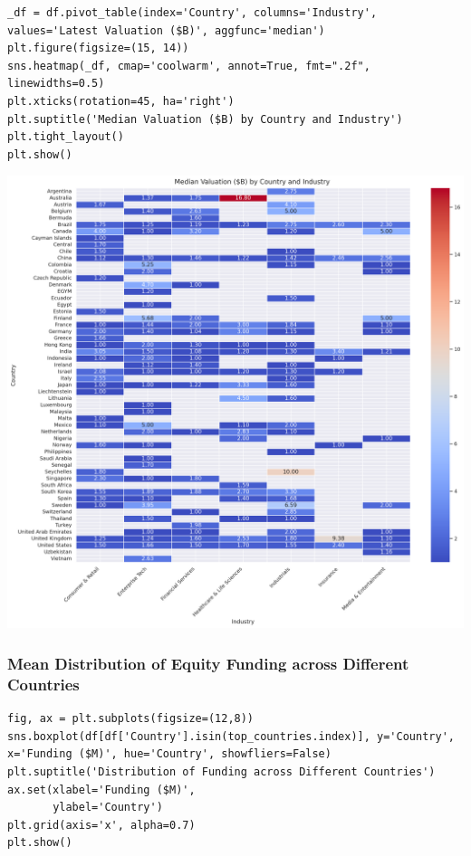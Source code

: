 \documentclass[a4paper,12pt]{article}
\begin{document}
\begin{verbatim}
_df = df.pivot_table(index='Country', columns='Industry', values='Latest Valuation ($B)', aggfunc='median')
plt.figure(figsize=(15, 14))
sns.heatmap(_df, cmap='coolwarm', annot=True, fmt=".2f", linewidths=0.5)
plt.xticks(rotation=45, ha='right')
plt.suptitle('Median Valuation ($B) by Country and Industry')
plt.tight_layout()
plt.show()
\end{verbatim}

\begin{center}
\includegraphics[width=.9\linewidth]{./.ob-jupyter/8191e29d90b7253a853630fc7935bf3868045f13.png}
\label{}
\end{center}
\subsubsection{Mean Distribution of Equity Funding across Different Countries}
\label{sec:org0e7e60d}
\begin{verbatim}
fig, ax = plt.subplots(figsize=(12,8))
sns.boxplot(df[df['Country'].isin(top_countries.index)], y='Country', x='Funding ($M)', hue='Country', showfliers=False)
plt.suptitle('Distribution of Funding across Different Countries')
ax.set(xlabel='Funding ($M)',
       ylabel='Country')
plt.grid(axis='x', alpha=0.7)
plt.show()
\end{verbatim}
\end{document}
